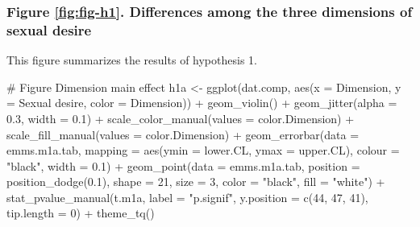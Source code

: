 \documentclass[
  bookmarksnumbered]{article}
\newenvironment{Shaded}{\begin{snugshade}}{\end{snugshade}}
\newcommand{\AttributeTok}[1]{\textcolor[rgb]{0.80,0.80,0.80}{#1}}
\newcommand{\CommentTok}[1]{\textcolor[rgb]{0.50,0.62,0.50}{#1}}
\newcommand{\DecValTok}[1]{\textcolor[rgb]{0.86,0.86,0.80}{#1}}
\newcommand{\FloatTok}[1]{\textcolor[rgb]{0.75,0.75,0.82}{#1}}
\newcommand{\FunctionTok}[1]{\textcolor[rgb]{0.94,0.94,0.56}{#1}}
\newcommand{\NormalTok}[1]{\textcolor[rgb]{0.80,0.80,0.80}{#1}}
\newcommand{\OtherTok}[1]{\textcolor[rgb]{0.94,0.94,0.56}{#1}}
\newcommand{\SpecialCharTok}[1]{\textcolor[rgb]{0.86,0.64,0.64}{#1}}
\newcommand{\StringTok}[1]{\textcolor[rgb]{0.80,0.58,0.58}{#1}}
\begin{document}
\hypertarget{figure-reffigfig-h1.-differences-among-the-three-dimensions-of-sexual-desire}{%
\subsubsection{Figure \ref{fig:fig-h1}. Differences among the three dimensions of sexual desire}\label{figure-reffigfig-h1.-differences-among-the-three-dimensions-of-sexual-desire}}

This figure summarizes the results of hypothesis 1.

\begin{Shaded}
\begin{Highlighting}[]
\CommentTok{\# Figure Dimension main effect}
\NormalTok{h1a }\OtherTok{\textless{}{-}} \FunctionTok{ggplot}\NormalTok{(dat.comp, }\FunctionTok{aes}\NormalTok{(}\AttributeTok{x =}\NormalTok{ Dimension, }\AttributeTok{y =} \StringTok{\textasciigrave{}}\AttributeTok{Sexual desire}\StringTok{\textasciigrave{}}\NormalTok{, }\AttributeTok{color =}\NormalTok{ Dimension)) }\SpecialCharTok{+}
  \FunctionTok{geom\_violin}\NormalTok{() }\SpecialCharTok{+}
  \FunctionTok{geom\_jitter}\NormalTok{(}\AttributeTok{alpha =} \FloatTok{0.3}\NormalTok{, }\AttributeTok{width =} \FloatTok{0.1}\NormalTok{) }\SpecialCharTok{+}
  \FunctionTok{scale\_color\_manual}\NormalTok{(}\AttributeTok{values =}\NormalTok{ color.Dimension) }\SpecialCharTok{+}
  \FunctionTok{scale\_fill\_manual}\NormalTok{(}\AttributeTok{values =}\NormalTok{ color.Dimension) }\SpecialCharTok{+}
  \FunctionTok{geom\_errorbar}\NormalTok{(}\AttributeTok{data =}\NormalTok{ emms.m1a.tab, }
                \AttributeTok{mapping =} \FunctionTok{aes}\NormalTok{(}\AttributeTok{ymin =}\NormalTok{ lower.CL, }\AttributeTok{ymax =}\NormalTok{ upper.CL), }
                \AttributeTok{colour =} \StringTok{"black"}\NormalTok{, }\AttributeTok{width =} \FloatTok{0.1}\NormalTok{) }\SpecialCharTok{+}
  \FunctionTok{geom\_point}\NormalTok{(}\AttributeTok{data =}\NormalTok{ emms.m1a.tab, }
             \AttributeTok{position =} \FunctionTok{position\_dodge}\NormalTok{(}\FloatTok{0.1}\NormalTok{), }
             \AttributeTok{shape =} \DecValTok{21}\NormalTok{, }\AttributeTok{size =} \DecValTok{3}\NormalTok{,}
             \AttributeTok{color =} \StringTok{"black"}\NormalTok{, }\AttributeTok{fill =} \StringTok{"white"}\NormalTok{) }\SpecialCharTok{+}
  \FunctionTok{stat\_pvalue\_manual}\NormalTok{(t.m1a, }
                     \AttributeTok{label =} \StringTok{"p.signif"}\NormalTok{, }
                     \AttributeTok{y.position =} \FunctionTok{c}\NormalTok{(}\DecValTok{44}\NormalTok{, }\DecValTok{47}\NormalTok{, }\DecValTok{41}\NormalTok{), }
                     \AttributeTok{tip.length =} \DecValTok{0}\NormalTok{) }\SpecialCharTok{+}
  \FunctionTok{theme\_tq}\NormalTok{()}


\end{Highlighting}
\end{Shaded}
\end{document}
